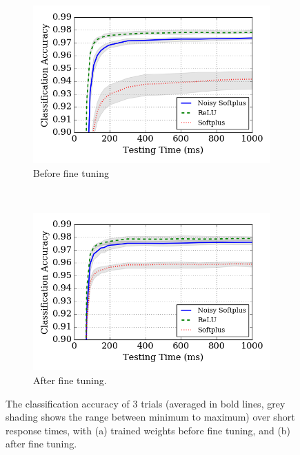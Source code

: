 	\begin{figure}[htb!]
		\centering
		\begin{subfigure}[t]{0.7\textwidth}
			\includegraphics[width=\textwidth]{pics_iconip/revise_8-2.png}
			\caption{Before fine tuning}
		\end{subfigure}\\
		\begin{subfigure}[t]{0.7\textwidth}
			\includegraphics[width=\textwidth]{pics_iconip/revise_8-3.png}
			\caption{After fine tuning.}
		\end{subfigure}
		
		\caption[The classification accuracy after fine tuning.]{The classification accuracy of 3 trials (averaged in bold lines, grey shading shows the range between minimum to maximum) over short response times, with (a) trained weights before fine tuning, and (b) after fine tuning.}
		\label{fig:ca_time}	
	\end{figure}
	
